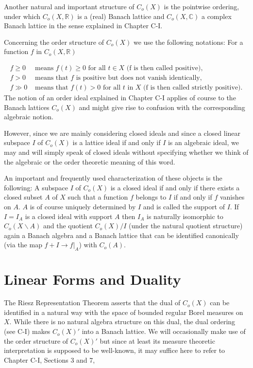 Another natural and important structure of $C_{o}(X)$ is the pointwise ordering, under which $C_{o}(X,\mathbb{R})$ is a (real) Banach lattice and $C_{o}(X,\mathbb{C})$ a complex Banach lattice in the sense explained in Chapter C-I.

Concerning the order structure of $C_{o}(X)$ we use the following notations: For a function $f$ in $C_{o}(X,\mathbb{R})$

\[
\begin{aligned}
	f \geq 0 &\text{ means } f(t) \geq 0 \text{ for all } t \in X \text{ (f is 			             then called positive)}, \\
	f > 0 &\text{ means that } f \text{ is positive but does not vanish identically}, \\
	f \gg 0 &\text{ means that } f(t) > 0 \text{ for all } t \text{ in } X \text{ (f is then called strictly positive)}.
\end{aligned}
\]
The notion of an order ideal explained in Chapter C-I applies of course to the Banach lattices $C_{o}(X)$ and might give rise to confusion with the corresponding algebraic notion.

However, since we are mainly considering closed ideals and since a closed linear subspace $I$ of $C_{o}(X)$ is a lattice ideal if and only if $I$ is an algebraic ideal, we may and will simply speak of closed ideals without specifying whether we think of the algebraic or the order theoretic meaning of this word.

An important and frequently used characterization of these objects is the following: A subspace $I$ of $C_{o}(X)$ is a closed ideal if and only if there exists a closed subset $A$ of $X$ such that a function $f$ belongs to $I$ if and only if $f$ vanishes on $A$.
$A$ is of course uniquely determined by $I$ and is called the support of $I$.
If $I = I_{A}$ is a closed ideal with support $A$ then $I_{A}$ is naturally isomorphic to $C_{o}(X\backslash A)$ and the quotient $C_{o}(X)/I$ (under the natural quotient structure) again a Banach algebra and a Banach lattice that can be identified canonically (via the map $f + I \to f|_{A}$) with $C_{o}(A)$.

\section{Linear Forms and Duality}\label{sec:b1-2}

The Riesz Representation Theorem asserts that the dual of $C_{o}(X)$ can be identified in a natural way with the space of bounded regular Borel measures on $X$.
While there is no natural algebra structure on this dual, the dual ordering (see C-I) makes $C_{o}(X)'$ into a Banach lattice.
We will occasionally make use of the order structure of $C_{o}(X)'$ but since at least its measure theoretic interpretation is supposed to be well-known, it may suffice here to refer to Chapter C-I, Sections 3 and 7, 

